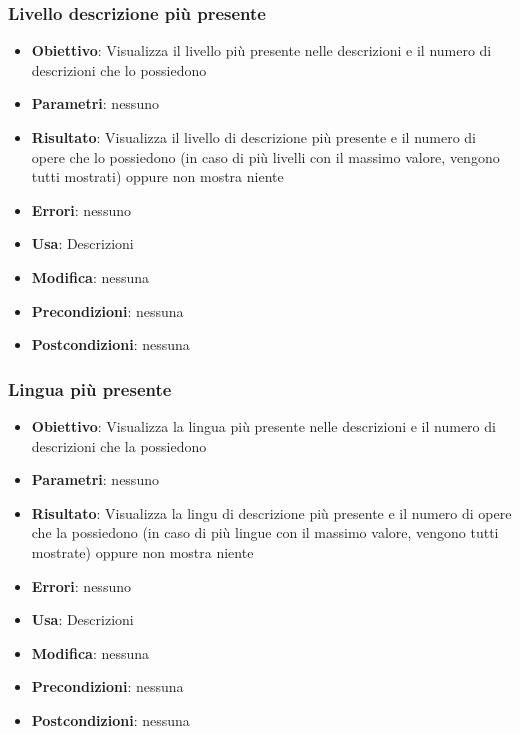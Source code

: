 \subsubsection{Livello descrizione più presente}
\begin{itemize}
	\item \textbf{Obiettivo}: Visualizza il livello più presente nelle descrizioni e il numero di descrizioni che lo possiedono
	\item \textbf{Parametri}: nessuno
	\item \textbf{Risultato}: Visualizza il livello di descrizione più presente e il numero di opere che lo possiedono (in caso di più livelli con il massimo valore, vengono tutti mostrati) oppure non mostra niente
	\item \textbf{Errori}: nessuno
	\item \textbf{Usa}: Descrizioni
	\item \textbf{Modifica}: nessuna
	\item \textbf{Precondizioni}: nessuna
	\item \textbf{Postcondizioni}: nessuna
\end{itemize}

\subsubsection{Lingua più presente}
\begin{itemize}
	\item \textbf{Obiettivo}: Visualizza la lingua più presente nelle descrizioni e il numero di descrizioni che la possiedono
	\item \textbf{Parametri}: nessuno
	\item \textbf{Risultato}: Visualizza la lingu di descrizione più presente e il numero di opere che la possiedono (in caso di più lingue con il massimo valore, vengono tutti mostrate) oppure non mostra niente
	\item \textbf{Errori}: nessuno
	\item \textbf{Usa}: Descrizioni
	\item \textbf{Modifica}: nessuna
	\item \textbf{Precondizioni}: nessuna
	\item \textbf{Postcondizioni}: nessuna
\end{itemize}
